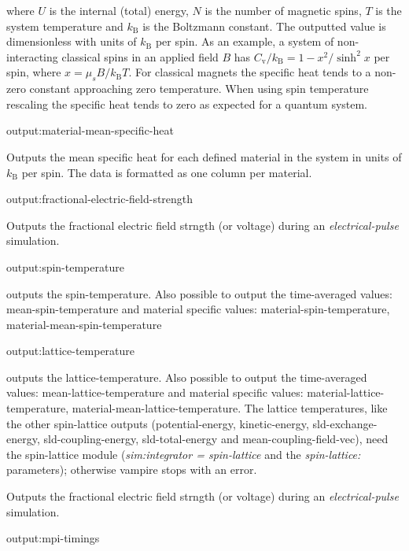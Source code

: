 \noindent where $U$ is the internal (total) energy, $N$ is the number of magnetic spins, $T$ is the system temperature and $k_{\mathrm{B}}$ is the Boltzmann constant. The outputted value is dimensionless with units of $k_{\mathrm{B}}$ per spin. As an example, a system of non-interacting classical spins in an applied field $B$ has $C_{\mathrm{v}}/k_{\mathrm{B}} = 1 - x^2/\sinh^2 x$ per spin, where $x = \mu_s B / k_{\mathrm{B}} T$. For classical magnets the specific heat tends to a non-zero constant approaching zero temperature. When using spin temperature rescaling the specific heat tends to zero as expected for a quantum system.

{\zicf output:material-mean-specific-heat} Outputs the mean specific heat for each defined material in the system in units of $k_{\mathrm{B}}$ per spin. The data is formatted as one column per material.

{\zicf output:fractional-electric-field-strength}
Outputs the fractional electric field strngth (or voltage) during an \textit{electrical-pulse} simulation.


{\zicf output:spin-temperature} outputs the spin-temperature. Also possible to output the time-averaged values: mean-spin-temperature and material specific values: material-spin-temperature, material-mean-spin-temperature

{\zicf output:lattice-temperature} outputs the lattice-temperature. Also possible to output the time-averaged values: mean-lattice-temperature and material specific values: material-lattice-temperature, material-mean-lattice-temperature. The lattice temperatures, like the other spin-lattice outputs (potential-energy, kinetic-energy, sld-exchange-energy, sld-coupling-energy, sld-total-energy and mean-coupling-field-vec), need the spin-lattice module (\textit{sim:integrator = spin-lattice} and the \textit{spin-lattice:} parameters); otherwise vampire stops with an error.



Outputs the fractional electric field strngth (or voltage) during an \textit{electrical-pulse} simulation.

{\zicf output:mpi-timings}

